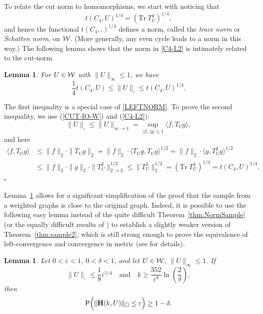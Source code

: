 \documentclass[12pt]{article}
\newtheorem{lemma}[theorem]{Lemma}
\numberwithin{equation}{section}
\newenvironment{proof}{\medskip\noindent{\bf Proof.
}}{\hfill$\square$\medskip}
\def\eps{\varepsilon}
\def\IO{{\infty\to1}}
\def\Prob{{\sf P}}
\def\bH{{\mathbf H}}
\begin{document}
To relate the cut norm to homomorphisms, we start with noticing that
\begin{equation}\label{C4-L2}
t(C_4,U)^{1/4}=(\text{Tr}\ T_U^4)^{1/4},
\end{equation}
and hence the functional $t(C_4,.)^{1/4}$ defines a norm, called the
{\it trace norm} or {\it Schatten norm}, on ${\cal W}$. (More generally,
any even cycle leads to a norm in this way.) The following lemma
shows that the norm in \eqref{C4-L2} is intimately related to the
cut-norm.

\begin{lemma}\label{lem:C4-SQUARE}
For $U\in{\cal W}$ with $\|U\|_\infty\le 1$, we have
\[
\frac14 t(C_4,U)\le \|U\|_\square\le t(C_4,U)^{1/4}.
\]
\end{lemma}

\begin{proof}
The first inequality is a special case of \eqref{LEFTNORM}. To prove
the second inequality, we use (\ref{CUT-IO-W}) and (\ref{C4-L2}):
\[
\|U\|_\square \le \|U\|_\IO = \sup_{|f|,|g|\le 1} \langle f,
T_Ug\rangle,
\]
and here
\begin{align*}
\langle f, T_Ug\rangle &\le \|f\|_2\cdot\|T_Ug\|_2 =
\|f\|_2\cdot\langle T_Ug,T_Ug\rangle^{1/2} = \|f\|_2\cdot\langle g,
T_U^2g\rangle^{1/2}\\
&\le \|f\|_2\cdot\|g\|_2\cdot \|T_U^2\|_{2\to 2}^{1/2}\le
\|T_U^2\|_2^{1/2}=(\text{Tr}\ T_U^4)^{1/4}= t(C_4,U)^{1/4}.
\end{align*}
\end{proof}

Lemma~\ref{lem:C4-SQUARE} allows for a significant simplification of
the proof that the sample from a weighted graphs is close to the
original graph. Indeed, it is possible to use the following easy
lemma instead of the quite difficult Theorem~\ref{thm:NormSample}
(or the equally difficult results of \cite{AFKK}) to establish a
slightly weaker version of Theorem~\ref{thm:sample2}, which is still
strong enough to prove the equivalence of left-convergence and
convergence in metric (see \cite{BCLSV-1} for details).

\begin{lemma}\label{lem:Norm-Sampl}
Let $0<\eps<1$, $0<\delta<1$, and let
$U\in{\cal W}$, $\|U\|_\infty\le 1$.
If
\smallskip
\[
\|U\|_\square\leq \frac 18\eps^{1/4}
\quad\text{and}\quad k\ge \frac{352}{\eps^8}\ln(\frac{2}{\delta}),
\]
then
\[
\Prob\Bigl(\|\bH(k,U)\|_\square \le \eps\Bigr)\geq 1-\delta.
\]
\end{lemma}
\end{document}
